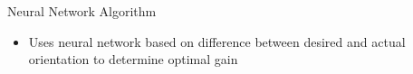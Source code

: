 \documentclass[final]{beamer}
\newlength{\onecolwid}
\begin{document}
\begin{frame}[t]
\begin{columns}[t]
\begin{column}{\onecolwid}
\begin{block}{Neural Network Algorithm}
\vskip -1cm
\begin{itemize}
    \item Uses neural network based on difference between desired and actual orientation to determine optimal gain
\end{itemize} 

 \begin{figure}
  \centering


\end{figure}
\end{block}
\end{column}
\end{columns}
\end{frame}
\end{document}
